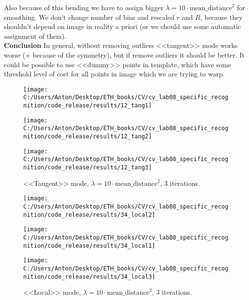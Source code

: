\documentclass{report}
\begin{document}
Also because of this bending we have to assign bigger $\lambda=10\cdot\text{mean\_distance}^2$ for smoothing. We don't change number of bins and rescaled $r$ and $R$, because they shouldn't depend on image in reality a priori (or we should use some automatic assignment of them).\\
\textbf{Conclusion}
In general, without removing outliers <<tangent>> mode works worse (+ because of the symmetry), but if remove outliers it should be better. It could be possible to use <<dummy>> points in template, which have some threshold level of cost for all points in image which we are trying to warp.
	\begin{figure}[h]
		\begin{center}
			\label{tang1}
			\begin{minipage}[h]{0.31\linewidth}
				\texttt{[image: C:/Users/Anton/Desktop/ETH\_books/CV/cv\_lab08\_specific\_recognition/code\_release/results/12\_tang1]}
			\end{minipage}
			\hfill
			\begin{minipage}[h]{0.31\linewidth}
				\texttt{[image: C:/Users/Anton/Desktop/ETH\_books/CV/cv\_lab08\_specific\_recognition/code\_release/results/12\_tang2]}
			\end{minipage}
				\hfill
				\begin{minipage}[h]{0.31\linewidth}
					\texttt{[image: C:/Users/Anton/Desktop/ETH\_books/CV/cv\_lab08\_specific\_recognition/code\_release/results/12\_tang3]}
				\end{minipage}
			
		\caption{<<Tangent>> mode, $\lambda=10\cdot\text{mean\_distance}^2$, 3 iterations.}
	\end{center}
\end{figure}

	\begin{figure}[h]
	\begin{center}
		\label{tang1}
		\begin{minipage}[h]{0.31\linewidth}
			\texttt{[image: C:/Users/Anton/Desktop/ETH\_books/CV/cv\_lab08\_specific\_recognition/code\_release/results/34\_local2]}
		\end{minipage}
		\hfill
		\begin{minipage}[h]{0.31\linewidth}
			\texttt{[image: C:/Users/Anton/Desktop/ETH\_books/CV/cv\_lab08\_specific\_recognition/code\_release/results/34\_local1]}
		\end{minipage}
		\hfill
		\begin{minipage}[h]{0.31\linewidth}
			\texttt{[image: C:/Users/Anton/Desktop/ETH\_books/CV/cv\_lab08\_specific\_recognition/code\_release/results/34\_local3]}
		\end{minipage}
		
		\caption{<<Local>> mode, $\lambda=10\cdot\text{mean\_distance}^2$, 3 iterations.}
	\end{center}
\end{figure}
\end{document}

